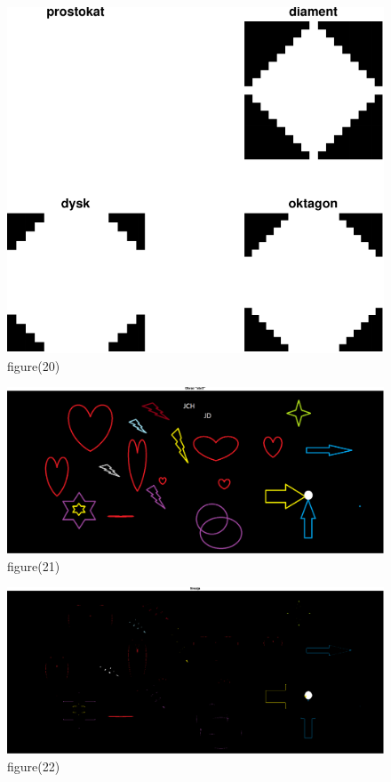 \documentclass[10pt,a4paper,twoside]{article}%
\begin{document}
\begin{figure}[H]
    \centering
    \includegraphics[width=1\linewidth]{kod matlab/myVectorFile20.pdf}
\caption{figure(20)}
    \label{fig:obr1}
\end{figure}

\begin{figure}[H]
    \centering
    \includegraphics[width=1\linewidth]{kod matlab/myVectorFile21.pdf}
\caption{figure(21)}
    \label{fig:obr1}
\end{figure}

\begin{figure}[H]
    \centering
    \includegraphics[width=1\linewidth]{kod matlab/myVectorFile22.pdf}
\caption{figure(22)}
    \label{fig:obr1}
\end{figure}
\end{document}
